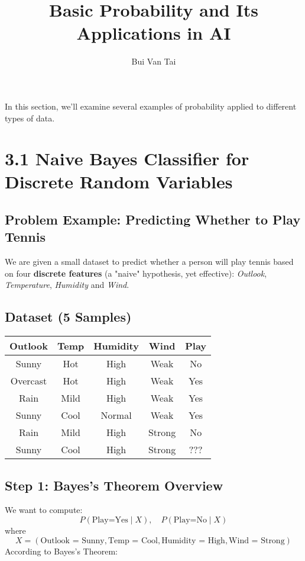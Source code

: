 \documentclass{article}
\title{Basic Probability and Its Applications in AI}
\author{Bui Van Tai}
\date{}
\begin{document}
\maketitle
In this section, we'll examine several examples of probability applied to different types of data.

\section*{3.1 Naive Bayes Classifier for Discrete Random Variables}
\subsection*{Problem Example: Predicting Whether to Play Tennis}

We are given a small dataset to predict whether a person will play tennis based on four \textbf{discrete features} (a "naive" hypothesis, yet effective): \textit{Outlook}, \textit{Temperature}, \textit{Humidity} and \textit{Wind}.

\subsection*{Dataset (5 Samples)}

\begin{center}
\begin{tabular}{|c|c|c|c|c|}
\hline
Outlook & Temp & Humidity & Wind & Play \\
\hline
Sunny & Hot & High & Weak & No \\
Overcast & Hot & High & Weak & Yes \\
Rain & Mild & High & Weak & Yes \\
Sunny & Cool & Normal & Weak & Yes \\
Rain & Mild & High & Strong & No \\
Sunny & Cool & High & Strong & ??? \\
\hline
\end{tabular}
\end{center}

\subsection*{Step 1: Bayes's Theorem Overview}
We want to compute:
$$
P(\text{Play=Yes} \mid X), \quad P(\text{Play=No} \mid X)
$$
where $$X = (\text{Outlook = Sunny}, \text{Temp = Cool}, \text{Humidity = High}, \text{Wind = Strong})$$
According to Bayes's Theorem:
\end{document}
